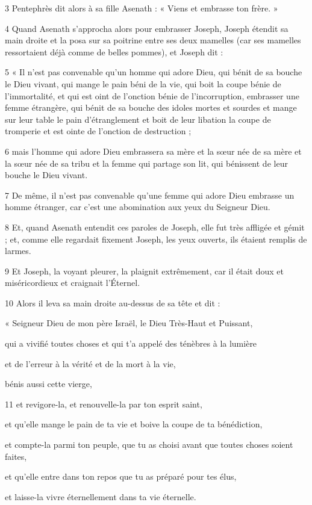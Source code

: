 \par 3 Pentephrès dit alors à sa fille Asenath : « Viens et embrasse ton frère. »

\par 4 Quand Asenath s'approcha alors pour embrasser Joseph, Joseph étendit sa main droite et la posa sur sa poitrine entre ses deux mamelles (car ses mamelles ressortaient déjà comme de belles pommes), et Joseph dit :

\par 5 « Il n'est pas convenable qu'un homme qui adore Dieu, qui bénit de sa bouche le Dieu vivant, qui mange le pain béni de la vie, qui boit la coupe bénie de l'immortalité, et qui est oint de l'onction bénie de l'incorruption, embrasser une femme étrangère, qui bénit de sa bouche des idoles mortes et sourdes et mange sur leur table le pain d'étranglement et boit de leur libation la coupe de tromperie et est ointe de l'onction de destruction ;

\par 6 mais l'homme qui adore Dieu embrassera sa mère et la sœur née de sa mère et la sœur née de sa tribu et la femme qui partage son lit, qui bénissent de leur bouche le Dieu vivant.

\par 7 De même, il n'est pas convenable qu'une femme qui adore Dieu embrasse un homme étranger, car c'est une abomination aux yeux du Seigneur Dieu.

\par 8 Et, quand Asenath entendit ces paroles de Joseph, elle fut très affligée et gémit ; et, comme elle regardait fixement Joseph, les yeux ouverts, ils étaient remplis de larmes.

\par 9 Et Joseph, la voyant pleurer, la plaignit extrêmement, car il était doux et miséricordieux et craignait l'Éternel.

\par 10 Alors il leva sa main droite au-dessus de sa tête et dit :

\par « Seigneur Dieu de mon père Israël, le Dieu Très-Haut et Puissant,
\par qui a vivifié toutes choses et qui t'a appelé des ténèbres à la lumière
\par et de l'erreur à la vérité et de la mort à la vie,
\par bénis aussi cette vierge,

\par 11 et revigore-la, et renouvelle-la par ton esprit saint,
\par et qu'elle mange le pain de ta vie et boive la coupe de ta bénédiction,
\par et compte-la parmi ton peuple, que tu as choisi avant que toutes choses soient faites,
\par et qu'elle entre dans ton repos que tu as préparé pour tes élus,
\par et laisse-la vivre éternellement dans ta vie éternelle.


